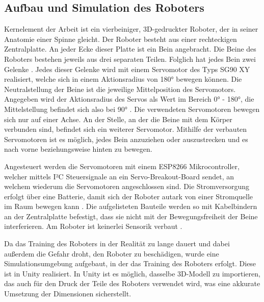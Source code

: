 \subsection{Aufbau und Simulation des Roboters}
Kernelement der Arbeit ist ein vierbeiniger, 3D-gedruckter Roboter, der in seiner Anatomie einer Spinne gleicht.
Der Roboter besteht aus einer rechteckigen Zentralplatte.
An jeder Ecke dieser Platte ist ein Bein angebracht.
Die Beine des Roboters bestehen jeweils aus drei separaten Teilen.
Folglich hat jedes Bein zwei Gelenke \cite[52]{waidner.2020}.
Jedes dieser Gelenke wird mit einem Servomotor des Typs SG90 XY realisiert, welche sich in einem Aktionsradius von 180° bewegen können.
Die Neutralstellung der Beine ist die jeweilige Mittelposition des Servomotors.
Angegeben wird der Aktionsradius des Servos als Wert im Bereich 0° - 180°, die Mittelstellung befindet sich also bei 90° \cite[38]{waidner.2020}.
Die verwendeten Servomotoren bewegen sich nur auf einer Achse.
An der Stelle, an der die Beine mit dem Körper verbunden sind, befindet sich ein weiterer Servomotor.
Mithilfe der verbauten Servomotoren ist es möglich, jedes Bein anzuziehen oder auszustrecken und es nach vorne beziehungsweise hinten zu bewegen.

Angesteuert werden die Servomotoren mit einem ESP8266 Mikrocontroller, welcher mittels I²C Steuersignale an ein Servo-Breakout-Board sendet, an welchem wiederum die Servomotoren angeschlossen sind.
Die Stromversorgung erfolgt über eine Batterie, damit sich der Roboter autark von einer Stromquelle im Raum bewegen kann \cite[54]{waidner.2020}.
Die aufgelisteten Bauteile werden so mit Kabelbindern an der Zentralplatte befestigt, dass sie nicht mit der Bewegungsfreiheit der Beine interferieren.
Am Roboter ist keinerlei Sensorik verbaut \cite[36]{waidner.2020}.

Da das Training des Roboters in der Realität zu lange dauert und dabei außerdem die Gefahr droht, den Roboter zu beschädigen, wurde eine Simulationsumgebung aufgebaut, in der das Training des Roboters erfolgt.
Diese ist in Unity realisiert.
In Unity ist es möglich, dasselbe 3D-Modell zu importieren, das auch für den Druck der Teile des Roboters verwendet wird, was eine akkurate Umsetzung der Dimensionen sicherstellt.

